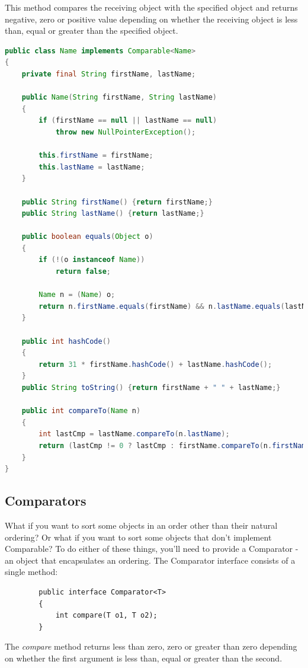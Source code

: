 \documentclass[10 pt]{book}
\begin{document}
This method compares the receiving object with the specified object and returns negative, zero or positive value depending on whether the receiving object is less than, equal or greater than the specified object.
\begin{lstlisting}[language = java, backgroundcolor = \color{white}]
public class Name implements Comparable<Name>
{
    private final String firstName, lastName;

    public Name(String firstName, String lastName)
    {
        if (firstName == null || lastName == null)
            throw new NullPointerException();

        this.firstName = firstName;
        this.lastName = lastName;
    }

    public String firstName() {return firstName;}
    public String lastName() {return lastName;}

    public boolean equals(Object o)
    {
        if (!(o instanceof Name))
            return false;

        Name n = (Name) o;
        return n.firstName.equals(firstName) && n.lastName.equals(lastName);
    }

    public int hashCode()
    {
    	return 31 * firstName.hashCode() + lastName.hashCode();
    }
    public String toString() {return firstName + " " + lastName;}

    public int compareTo(Name n)
    {
        int lastCmp = lastName.compareTo(n.lastName);
        return (lastCmp != 0 ? lastCmp : firstName.compareTo(n.firstName));
    }
}
\end{lstlisting}

\subsection{Comparators}
What if you want to sort some objects in an order other than their natural ordering? Or what if you want to sort some objects that don't implement Comparable? To do either of these things, you'll need to provide a Comparator - an object that encapsulates an ordering. The Comparator interface consists of a single method:
	\begin{lstlisting}
		public interface Comparator<T>
		{
			int compare(T o1, T o2);
		}
	\end{lstlisting}

The \textit{compare} method returns less than zero, zero or greater than zero depending on whether the first argument is less than, equal or greater than the second.
\end{document}
